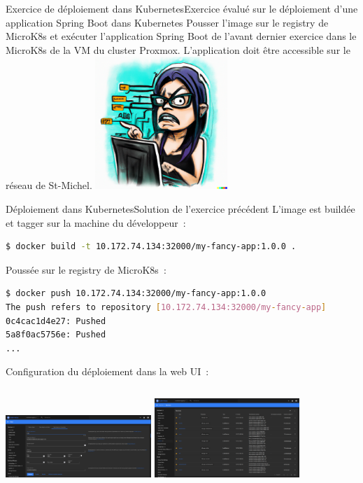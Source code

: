 \documentclass{beamer}
\begin{document}
    \begin{frame}{Exercice \execcounterdispinc{} de déploiement dans Kubernetes}{Exercice évalué sur le déploiement d'une application Spring Boot dans Kubernetes}
        Pousser l'image sur le registry de MicroK8s et exécuter l'application Spring Boot  de l'avant dernier exercice dans le MicroK8s de la VM du cluster Proxmox.
        \bigbreak
        L'application doit être accessible sur le réseau de St-Michel.
        \bigbreak
        \centering
        \includegraphics[width=5cm]{image/maniac-programmer-sorting-her-code}
    \end{frame}

    \begin{frame}[fragile]{Déploiement dans Kubernetes}{Solution de l'exercice précédent}
        L'image est buildée et tagger sur la machine du développeur~:
        \begin{lstlisting}[language=bash]
$ docker build -t 10.172.74.134:32000/my-fancy-app:1.0.0 .
        \end{lstlisting}
        Poussée sur le registry de MicroK8s~:
        \begin{lstlisting}[language=bash]
$ docker push 10.172.74.134:32000/my-fancy-app:1.0.0
The push refers to repository [10.172.74.134:32000/my-fancy-app]
0c4cac1d4e27: Pushed
5a8f0ac5756e: Pushed
...
        \end{lstlisting}
        Configuration du déploiement dans la web UI~:
        \begin{columns}
            \centering
            \includegraphics[width=5.5cm]{image/k8s-deployment-configuration}
            \centering
            \includegraphics[width=5.5cm]{image/k8s-services}
        \end{columns}
    \end{frame}
\end{document}
